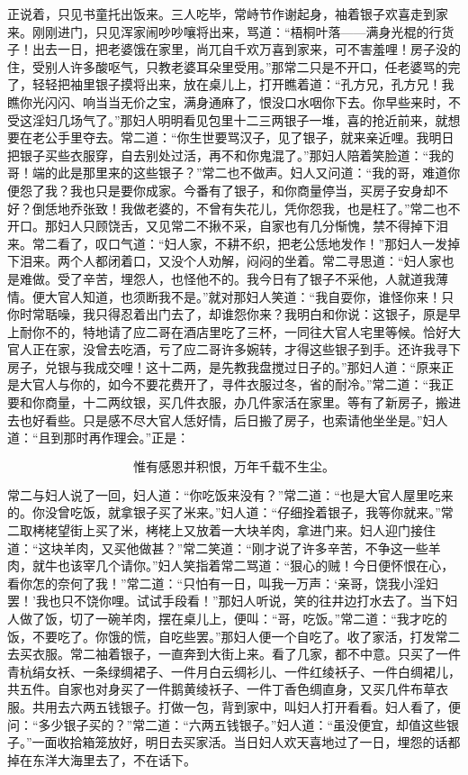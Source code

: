 正说着，只见书童托出饭来。三人吃毕，常峙节作谢起身，袖着银子欢喜走到家来。刚刚进门，只见浑家闹吵吵嚷将出来，骂道：“梧桐叶落——满身光棍的行货子！出去一日，把老婆饿在家里，尚兀自千欢万喜到家来，可不害羞哩！房子没的住，受别人许多酸呕气，只教老婆耳朵里受用。”那常二只是不开口，任老婆骂的完了，轻轻把袖里银子摸将出来，放在桌儿上，打开瞧着道：“孔方兄，孔方兄！我瞧你光闪闪、响当当无价之宝，满身通麻了，恨没口水咽你下去。你早些来时，不受这淫妇几场气了。”那妇人明明看见包里十二三两银子一堆，喜的抢近前来，就想要在老公手里夺去。常二道：“你生世要骂汉子，见了银子，就来亲近哩。我明日把银子买些衣服穿，自去别处过活，再不和你鬼混了。”那妇人陪着笑脸道：“我的哥！端的此是那里来的这些银子？”常二也不做声。妇人又问道：“我的哥，难道你便怨了我？我也只是要你成家。今番有了银子，和你商量停当，买房子安身却不好？倒恁地乔张致！我做老婆的，不曾有失花儿，凭你怨我，也是枉了。”常二也不开口。那妇人只顾饶舌，又见常二不揪不采，自家也有几分惭愧，禁不得掉下泪来。常二看了，叹口气道：“妇人家，不耕不织，把老公恁地发作！”那妇人一发掉下泪来。两个人都闭着口，又没个人劝解，闷闷的坐着。常二寻思道：“妇人家也是难做。受了辛苦，埋怨人，也怪他不的。我今日有了银子不采他，人就道我薄情。便大官人知道，也须断我不是。”就对那妇人笑道：“我自耍你，谁怪你来！只你时常聒噪，我只得忍着出门去了，却谁怨你来？我明白和你说：这银子，原是早上耐你不的，特地请了应二哥在酒店里吃了三杯，一同往大官人宅里等候。恰好大官人正在家，没曾去吃酒，亏了应二哥许多婉转，才得这些银子到手。还许我寻下房子，兑银与我成交哩！这十二两，是先教我盘搅过日子的。”那妇人道：“原来正是大官人与你的，如今不要花费开了，寻件衣服过冬，省的耐冷。”常二道：“我正要和你商量，十二两纹银，买几件衣服，办几件家活在家里。等有了新房子，搬进去也好看些。只是感不尽大官人恁好情，后日搬了房子，也索请他坐坐是。”妇人道：“且到那时再作理会。”正是：

\[
惟有感恩并积恨，万年千载不生尘。
\]

常二与妇人说了一回，妇人道：“你吃饭来没有？”常二道：“也是大官人屋里吃来的。你没曾吃饭，就拿银子买了米来。”妇人道：“仔细拴着银子，我等你就来。”常二取栲栳望街上买了米，栲栳上又放着一大块羊肉，拿进门来。妇人迎门接住道：“这块羊肉，又买他做甚？”常二笑道：“刚才说了许多辛苦，不争这一些羊肉，就牛也该宰几个请你。”妇人笑指着常二骂道：“狠心的贼！今日便怀恨在心，看你怎的奈何了我！”常二道：“只怕有一日，叫我一万声：‘亲哥，饶我小淫妇罢！’我也只不饶你哩。试试手段看！”那妇人听说，笑的往井边打水去了。当下妇人做了饭，切了一碗羊肉，摆在桌儿上，便叫：“哥，吃饭。”常二道：“我才吃的饭，不要吃了。你饿的慌，自吃些罢。”那妇人便一个自吃了。收了家活，打发常二去买衣服。常二袖着银子，一直奔到大街上来。看了几家，都不中意。只买了一件青杭绢女袄、一条绿绸裙子、一件月白云绸衫儿、一件红绫袄子、一件白绸裙儿，共五件。自家也对身买了一件鹅黄绫袄子、一件丁香色绸直身，又买几件布草衣服。共用去六两五钱银子。打做一包，背到家中，叫妇人打开看看。妇人看了，便问：“多少银子买的？”常二道：“六两五钱银子。”妇人道：“虽没便宜，却值这些银子。”一面收拾箱笼放好，明日去买家活。当日妇人欢天喜地过了一日，埋怨的话都掉在东洋大海里去了，不在话下。

